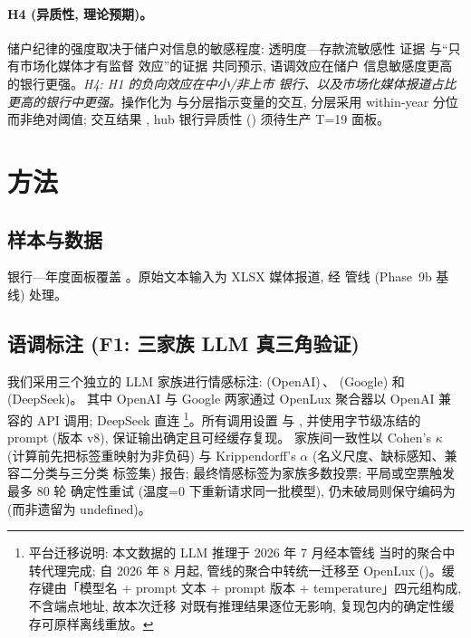 \paragraph{H4 (异质性, 理论预期)。}
储户纪律的强度取决于储户对信息的敏感程度: 透明度—存款流敏感性
证据 \parencite{chen2022transparency} 与``只有市场化媒体才有监督
效应''的证据 \parencite{you2018pen} 共同预示, 语调效应在储户
信息敏感度更高的银行更强。\emph{H4: H1 的负向效应在中小/非上市
银行、以及市场化媒体报道占比更高的银行中更强。}操作化为
 与分层指示变量的交互, 分层采用
within-year 分位而非绝对阈值; 交互结果 ,
hub 银行异质性 () 须待生产 T=19 面板。

\section{方法}\label{sec:method}
\subsection{样本与数据}
银行—年度面板覆盖 。原始文本输入为 XLSX 媒体报道,
经  管线 (Phase~9b 基线) 处理。

\subsection{语调标注 (F1: 三家族 LLM 真三角验证)}
我们采用三个独立的 LLM 家族进行情感标注:
 (OpenAI)\,、 (Google)
和  (DeepSeek)。
其中 OpenAI 与 Google 两家通过 OpenLux 聚合器以 OpenAI 兼容的
 API 调用; DeepSeek 直连
\footnote{平台迁移说明: 本文数据的 LLM 推理于 2026 年 7 月经本管线
当时的聚合中转代理完成; 自 2026 年 8 月起, 管线的聚合中转统一迁移至
OpenLux ()。缓存键由「模型名 + prompt
文本 + prompt 版本 + temperature」四元组构成, 不含端点地址, 故本次迁移
对既有推理结果逐位无影响, 复现包内的确定性缓存可原样离线重放。}。所有调用设置  与
, 并使用字节级冻结的 prompt (版本 v8),
保证输出确定且可经缓存复现。
家族间一致性以 Cohen's $\kappa$ (计算前先把标签重映射为非负码)
与 Krippendorff's $\alpha$ (名义尺度、缺标感知、兼容二分类与三分类
标签集) 报告; 最终情感标签为家族多数投票; 平局或空票触发最多 80 轮
确定性重试 (温度=0 下重新请求同一批模型), 仍未破局则保守编码为
 (而非遗留为 undefined)。

